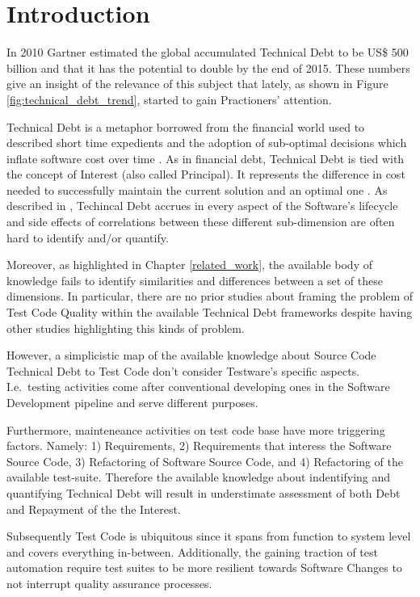 \chapter{Introduction}

In 2010 Gartner estimated the global accumulated Technical Debt to be US\$ 500 billion \cite{costOfTechnicalDebt} and that it has the potential to double by the end of 2015. These numbers give an insight of the relevance of this subject that lately, as shown in Figure \ref{fig:technical_debt_trend}, started to gain Practioners' attention.

Technical Debt is a metaphor borrowed from the financial world used to described short time expedients and the adoption of sub-optimal decisions which inflate software cost over time \cite{first_mention_of_TD}. As in financial debt, Technical Debt is tied with the concept of Interest (also called Principal). It represents the difference in cost needed to successfully maintain the current solution and an optimal one \cite{technicalDebtInterest}. As described in \cite{mapping_study_td, exploration_of_td, exploration_of_td2}, Techincal Debt accrues in every aspect of the Software's lifecycle and side effects of correlations between these different sub-dimension are often hard to identify and/or quantify.

Moreover, as highlighted in Chapter \ref{related_work}, the available body of knowledge fails to identify similarities and differences between a set of these dimensions. In particular, there are no prior studies about framing the problem of Test Code Quality within the available Technical Debt frameworks despite having other studies highlighting this kinds of problem.

However, a simplicistic map of the available knowledge about Source Code Technical Debt to Test Code don't consider Testware's specific aspects. I.e.\ testing activities come after conventional developing ones in the Software Development pipeline and serve different purposes. 

Furthermore, mainteneance activities on test code base have more triggering factors. Namely: 1) Requirements, 2) Requirements that interess the Software Source Code, 3) Refactoring of Software Source Code, and 4) Refactoring of the available test-suite. Therefore the available knowledge about indentifying and quantifying Technical Debt will result in understimate assessment of both Debt and Repayment of the the Interest.

Subsequently Test Code is ubiquitous since it spans from function to system level and covers everything in-between. Additionally, the gaining traction of test automation require test suites to be more resilient towards Software Changes to not interrupt quality assurance processes.

